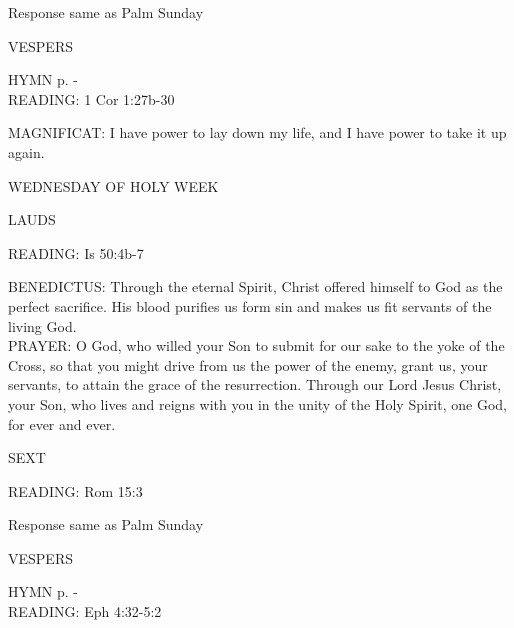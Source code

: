 Response same as Palm Sunday

\begin{flushleft}\normalsize{\uppercase{VESPERS\\}}\end{flushleft}
\small{\uppercase{HYMN} p. \pageref{lent:firstHymn}-\pageref{lent:lastHymn}\\}
\noindent\small{\uppercase{READING:}}    1 Cor 1:27b-30 \textbf{   \\}

\noindent\small{\uppercase{MAGNIFICAT:}}	I have power to lay down my life, and I have power to take it up again.\\

	\begin{center}
\normalsize WEDNESDAY OF HOLY WEEK
	\end{center}

\begin{flushleft}\normalsize{\uppercase{LAUDS\\}}\end{flushleft}
\noindent\small{\uppercase{READING:}}    Is 50:4b-7 \textbf{   \\}

\noindent\small{\uppercase{BENEDICTUS:}}	Through the eternal Spirit, Christ offered himself to God as the perfect sacrifice. His blood purifies us form sin and makes us fit servants of the living God.\\

\noindent\small{\uppercase{PRAYER:}}	O God, who willed your Son to submit for our sake to the yoke of the Cross, so that you might drive from us the power of the enemy, grant us, your servants, to attain the grace of the resurrection. Through our Lord Jesus Christ, your Son, who lives and reigns with you in the unity of the Holy Spirit, one God, for ever and ever.

\begin{flushleft}\normalsize{\uppercase{SEXT\\}}\end{flushleft}
\noindent\small{\uppercase{READING:}}    Rom 15:3 \textbf{   \\}

Response same as Palm Sunday

\begin{flushleft}\normalsize{\uppercase{VESPERS\\}}\end{flushleft}
\small{\uppercase{HYMN} p. \pageref{lent:firstHymn}-\pageref{lent:lastHymn}\\}
\noindent\small{\uppercase{READING:}}    Eph 4:32-5:2 \textbf{   \\}

